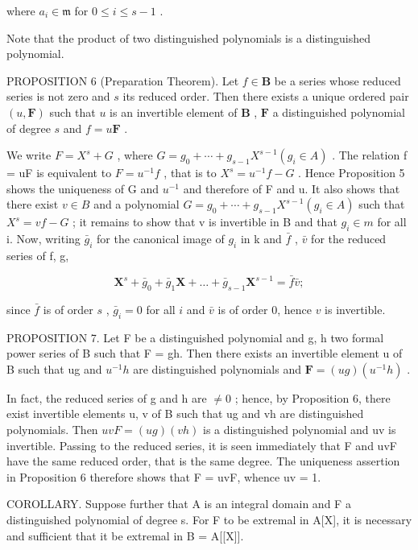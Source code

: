 where \(a_{i} \in \mathfrak{m}\) for \(0 \leqslant i \leqslant s - 1\) .

Note that the product of two distinguished polynomials is a distinguished polynomial.

PROPOSITION 6 (Preparation Theorem). Let \(f \in \mathbf{B}\) be a series whose reduced series is not zero and \(s\) its reduced order. Then there exists a unique ordered pair \((u, \mathbf{F})\) such that \(u\) is an invertible element of \(\mathbf{B}\) , \(\mathbf{F}\) a distinguished polynomial of degree \(s\) and \(f = u\mathbf{F}\) .

We write \(F = X^{s} + G\) , where \(G = g_{0} + \cdots + g_{s-1}X^{s-1} (g_{i} \in A)\) . The relation f = uF is equivalent to \(F = u^{-1}f\) , that is to \(X^{s} = u^{-1}f - G\) . Hence Proposition 5 shows the uniqueness of G and \(u^{-1}\) and therefore of F and u. It also shows that there exist \(v \in B\) and a polynomial \(G = g_{0} + \cdots + g_{s-1}X^{s-1} (g_{i} \in A)\) such that \(X^{s} = vf - G\) ; it remains to show that v is invertible in B and that \(g_{i} \in m\) for all i. Now, writing \(\bar{g}_{i}\) for the canonical image of \(g_{i}\) in k and \(\bar{f}\) , \(\bar{v}\) for the reduced series of f, g,

\[
\mathbf {X} ^ {s} + \bar {g} _ {0} + \bar {g} _ {1} \mathbf {X} + \dots + \bar {g} _ {s - 1} \mathbf {X} ^ {s - 1} = \bar {f} \bar {v};
\]

since \(\bar{f}\) is of order \(s\) , \(\bar{g}_i = 0\) for all \(i\) and \(\bar{v}\) is of order 0, hence \(v\) is invertible.

PROPOSITION 7. Let F be a distinguished polynomial and g, h two formal power series of B such that F = gh. Then there exists an invertible element u of B such that ug and \(u^{-1}h\) are distinguished polynomials and \(\mathbf{F} = (ug)(u^{-1}h)\) .

In fact, the reduced series of g and h are \(\neq0\) ; hence, by Proposition 6, there exist invertible elements u, v of B such that ug and vh are distinguished polynomials. Then \(uvF = (ug)(vh)\) is a distinguished polynomial and uv is invertible. Passing to the reduced series, it is seen immediately that F and uvF have the same reduced order, that is the same degree. The uniqueness assertion in Proposition 6 therefore shows that F = uvF, whence uv = 1.

COROLLARY. Suppose further that A is an integral domain and F a distinguished polynomial of degree s. For F to be extremal in A{[}X{]}, it is necessary and sufficient that it be extremal in B = A{[}{[}X{]}{]}.

